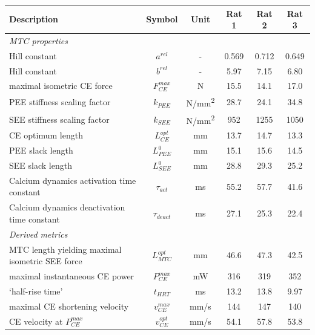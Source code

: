 \begin{tabular}{|l|c|c|c|c|c|} \hline
  \bfseries Description & \bfseries Symbol & \bfseries Unit & \bfseries Rat 1 & \bfseries Rat 2 & \bfseries Rat 3 \\ \hline
  \multicolumn{6}{|l|}{\itshape MTC properties} \\ \hline
Hill constant & $a^{rel}$ & - & 0.569 & 0.712 & 0.649 \\ \hline
Hill constant & $b^{rel}$ & - & 5.97 & 7.15 & 6.80 \\ \hline
maximal isometric CE force & $F_{CE}^{max}$ & N & 15.5 & 14.1 & 17.0 \\ \hline
PEE stiffness scaling factor & $k_{PEE}$ & N/mm\textsuperscript{2} & 28.7 & 24.1 & 34.8 \\ \hline
SEE stiffness scaling factor & $k_{SEE}$ & N/mm\textsuperscript{2} & 952 & 1255 & 1050 \\ \hline
CE optimum length & $L_{CE}^{opt}$ & mm & 13.7 & 14.7 & 13.3 \\ \hline
PEE slack length & $L_{PEE}^0$ & mm & 15.1 & 15.6 & 14.5 \\ \hline
SEE slack length & $L_{SEE}^0$ & mm & 28.8 & 29.3 & 25.2 \\ \hline
Calcium dynamics activation time constant & $\tau_{act}$ & ms & 55.2 & 57.7 & 41.6 \\ \hline
Calcium dynamics deactivation time constant & $\tau_{deact}$ & ms & 27.1 & 25.3 & 22.4 \\ \hline
  \multicolumn{6}{|l|}{\itshape Derived metrics} \\ \hline
MTC length yielding maximal isometric SEE force & $L_{MTC}^{opt}$ & mm & 46.6 & 47.3 & 42.5 \\ \hline
maximal instantaneous CE power & $P_{CE}^{max}$ & mW & 316 & 319 & 352 \\ \hline
`half-rise time' & $t_{HRT}$ & ms & 13.2 & 13.8 & 9.97 \\ \hline
maximal CE shortening velocity & $v_{CE}^{max}$ & mm/s & 144 & 147 & 140 \\ \hline
CE velocity at $P_{CE}^{max}$ & $v_{CE}^{opt}$ & mm/s & 54.1 & 57.8 & 53.8 \\ \hline
\end{tabular}